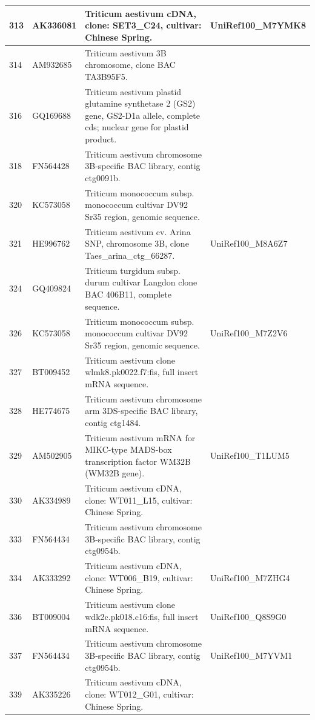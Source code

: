 \documentclass[10.9pt]{article} %
\begin{document}
{\begin{longtable}{|p{1.5cm}|p{2cm}|p{9cm}|p{3cm}|}
\hline
313 & AK336081 & Triticum aestivum cDNA, clone: SET3\_C24, cultivar: Chinese Spring. & UniRef100\_M7YMK8\\
\hline
314 & AM932685 & Triticum aestivum 3B chromosome, clone BAC TA3B95F5. & \\
\hline
316 & GQ169688 & Triticum aestivum plastid glutamine synthetase 2 (GS2) gene, GS2-D1a allele, complete cds; nuclear gene for plastid product. & \\
\hline
318 & FN564428 & Triticum aestivum chromosome 3B-specific BAC library, contig ctg0091b. & \\
\hline
320 & KC573058 & Triticum monococcum subsp. monococcum cultivar DV92 Sr35 region, genomic sequence. & \\
\hline
321 & HE996762 & Triticum aestivum cv. Arina SNP, chromosome 3B, clone Taes\_arina\_ctg\_66287. & UniRef100\_M8A6Z7\\
\hline
324 & GQ409824 & Triticum turgidum subsp. durum cultivar Langdon clone BAC 406B11, complete sequence. & \\
\hline
326 & KC573058 & Triticum monococcum subsp. monococcum cultivar DV92 Sr35 region, genomic sequence. & UniRef100\_M7Z2V6\\
\hline
327 & BT009452 & Triticum aestivum clone wlmk8.pk0022.f7:fis, full insert mRNA sequence. & \\
\hline
328 & HE774675 & Triticum aestivum chromosome arm 3DS-specific BAC library, contig ctg1484. & \\
\hline
329 & AM502905 & Triticum aestivum mRNA for MIKC-type MADS-box transcription factor WM32B (WM32B gene). & UniRef100\_T1LUM5\\
\hline
330 & AK334989 & Triticum aestivum cDNA, clone: WT011\_L15, cultivar: Chinese Spring. & \\
\hline
333 & FN564434 & Triticum aestivum chromosome 3B-specific BAC library, contig ctg0954b. & \\
\hline
334 & AK333292 & Triticum aestivum cDNA, clone: WT006\_B19, cultivar: Chinese Spring. & UniRef100\_M7ZHG4\\
\hline
336 & BT009004 & Triticum aestivum clone wdk2c.pk018.c16:fis, full insert mRNA sequence. & UniRef100\_Q8S9G0\\
\hline
337 & FN564434 & Triticum aestivum chromosome 3B-specific BAC library, contig ctg0954b. & UniRef100\_M7YVM1\\
\hline
339 & AK335226 & Triticum aestivum cDNA, clone: WT012\_G01, cultivar: Chinese Spring. & \\
\hline

\end{longtable}}
\end{document}
